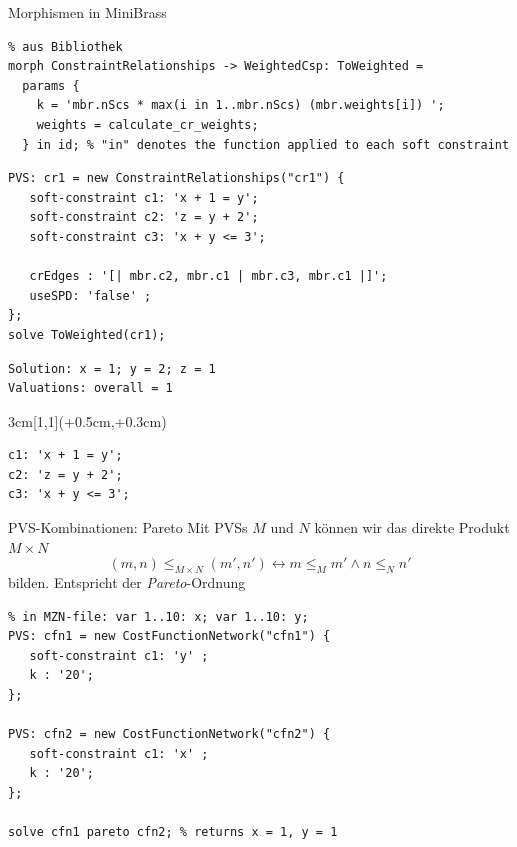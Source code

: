 \begin{frame}[fragile]{Morphismen in MiniBrass}
\begin{lstlisting}
% aus Bibliothek
morph ConstraintRelationships -> WeightedCsp: ToWeighted = 
  params {
    k = 'mbr.nScs * max(i in 1..mbr.nScs) (mbr.weights[i]) ';
    weights = calculate_cr_weights;
  } in id; % "in" denotes the function applied to each soft constraint 
\end{lstlisting}
\begin{lstlisting}   
PVS: cr1 = new ConstraintRelationships("cr1") {
   soft-constraint c1: 'x + 1 = y';
   soft-constraint c2: 'z = y + 2';
   soft-constraint c3: 'x + y <= 3';
   
   crEdges : '[| mbr.c2, mbr.c1 | mbr.c3, mbr.c1 |]';
   useSPD: 'false' ;
}; 
solve ToWeighted(cr1);
\end{lstlisting}
\begin{Verbatim}[fontsize=\small]
Solution: x = 1; y = 2; z = 1
Valuations: overall = 1
\end{Verbatim}
\begin{textblock*}{3cm}[1,1](\textwidth+0.5cm,\textheight+0.3cm)
\begin{center}
\begin{Verbatim}[fontsize=\small]
c1: 'x + 1 = y';
c2: 'z = y + 2';
c3: 'x + y <= 3';   
\end{Verbatim}

\end{center}
\end{textblock*}

\end{frame}

\begin{frame}[fragile]{PVS-Kombinationen: Pareto} \small
Mit PVSs $M$ und $N$ können wir das direkte Produkt $M \times N$ 
\[
(m, n) \leq_{M \times N} (m', n') \leftrightarrow m \leq_M m' \wedge n \leq_N n'
\]
bilden. Entspricht der \emph{Pareto}-Ordnung
\begin{lstlisting}
% in MZN-file: var 1..10: x; var 1..10: y;
PVS: cfn1 = new CostFunctionNetwork("cfn1") {
   soft-constraint c1: 'y' ;
   k : '20';
}; 

PVS: cfn2 = new CostFunctionNetwork("cfn2") {
   soft-constraint c1: 'x' ;
   k : '20';
}; 

solve cfn1 pareto cfn2; % returns x = 1, y = 1
\end{lstlisting}
\end{frame}


